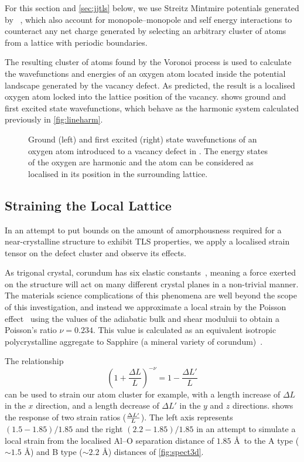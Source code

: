 For this section and \cref{sec:jjtls} below, we use Streitz Mintmire potentials generated by ~\cite{Gale2003}, which also account for monopole--monopole and self energy interactions to counteract any net charge generated by selecting an arbitrary cluster of atoms from a lattice with periodic boundaries.

The resulting cluster of atoms found by the Voronoi process is used to calculate the wavefunctions and energies of an oxygen atom located inside the potential landscape generated by the vacancy defect.
As predicted, the result is a localised oxygen atom locked into the lattice position of the vacancy.
 shows ground and first excited state wavefunctions, which behave as the harmonic system calculated previously in \cref{fig:lineharm}.

\begin{figure}[htp]
\resizebox{0.5\textwidth}{!}{}
\caption[Oxygen Recovering Crystalline Position]{\label{fig:clustrecover}Ground (left) and first excited (right) state wavefunctions of an oxygen atom introduced to a vacancy defect in . The energy states of the oxygen are harmonic and the atom can be considered as localised in its position in the surrounding lattice.}
\end{figure}

\subsection{Straining the Local Lattice}

In an attempt to put bounds on the amount of amorphousness required for a near-crystalline structure to exhibit TLS properties, we apply a localised strain tensor on the defect cluster and observe its effects.

As trigonal crystal, corundum has six elastic constants~\cite{Bass1995}, meaning a force exerted on the structure will act on many different crystal planes in a non-trivial manner.
The materials science complications of this phenomena are well beyond the scope of this investigation, and instead we approximate a local strain by the Poisson effect~\cite{Poisson1829} using the values of the adiabatic bulk and shear moduluii to obtain a Poisson's ratio $\nu = 0.234$.
This value is calculated as an equivalent isotropic polycrystalline aggregate to Sapphire (a mineral variety of corundum)~\cite{Gercek2007}.

The relationship
\begin{equation}
\left(1+\frac{\Delta L}{L}\right)^{-\nu} = 1-\frac{\Delta L'}{L}
\end{equation}
can be used to strain our atom cluster for example, with a length increase of $\Delta L$ in the $x$ direction, and a length decrease of $\Delta L'$ in the $y$ and $z$ directions.
 shows the response of two strain ratios ($\cramped{\frac{\Delta L'}{L}}$).
The left axis represents $(1.5-1.85)/1.85$ and the right $(2.2-1.85)/1.85$ in an attempt to simulate a local strain from the localised Al--O separation distance of $1.85$ \AA\ to the A type ($\sim 1.5$ \AA) and B type ($\sim 2.2$ \AA) distances of \cref{fig:spect3d}.

